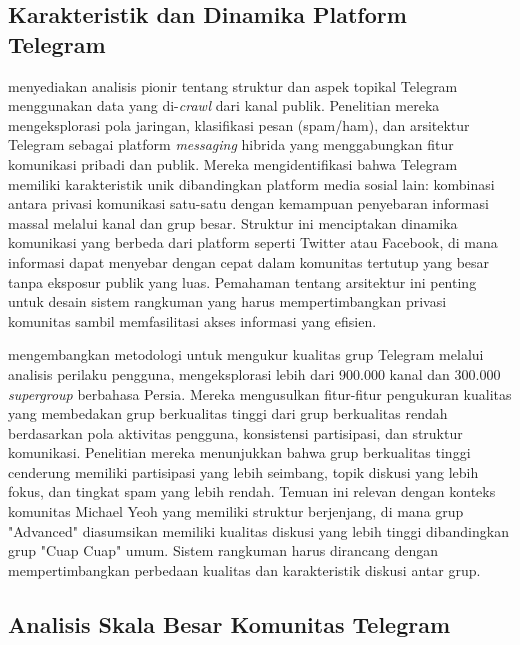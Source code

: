 \subsection{Karakteristik dan Dinamika Platform Telegram}

\textcite{nobari2017} menyediakan analisis pionir tentang struktur dan aspek topikal Telegram menggunakan data yang di-\textit{crawl} dari kanal publik. Penelitian mereka mengeksplorasi pola jaringan, klasifikasi pesan (spam/ham), dan arsitektur Telegram sebagai platform \textit{messaging} hibrida yang menggabungkan fitur komunikasi pribadi dan publik. Mereka mengidentifikasi bahwa Telegram memiliki karakteristik unik dibandingkan platform media sosial lain: kombinasi antara privasi komunikasi satu-satu dengan kemampuan penyebaran informasi massal melalui kanal dan grup besar. Struktur ini menciptakan dinamika komunikasi yang berbeda dari platform seperti Twitter atau Facebook, di mana informasi dapat menyebar dengan cepat dalam komunitas tertutup yang besar tanpa eksposur publik yang luas. Pemahaman tentang arsitektur ini penting untuk desain sistem rangkuman yang harus mempertimbangkan privasi komunitas sambil memfasilitasi akses informasi yang efisien.

\textcite{hashemi2019} mengembangkan metodologi untuk mengukur kualitas grup Telegram melalui analisis perilaku pengguna, mengeksplorasi lebih dari 900.000 kanal dan 300.000 \textit{supergroup} berbahasa Persia. Mereka mengusulkan fitur-fitur pengukuran kualitas yang membedakan grup berkualitas tinggi dari grup berkualitas rendah berdasarkan pola aktivitas pengguna, konsistensi partisipasi, dan struktur komunikasi. Penelitian mereka menunjukkan bahwa grup berkualitas tinggi cenderung memiliki partisipasi yang lebih seimbang, topik diskusi yang lebih fokus, dan tingkat spam yang lebih rendah. Temuan ini relevan dengan konteks komunitas Michael Yeoh yang memiliki struktur berjenjang, di mana grup "Advanced" diasumsikan memiliki kualitas diskusi yang lebih tinggi dibandingkan grup "Cuap Cuap" umum. Sistem rangkuman harus dirancang dengan mempertimbangkan perbedaan kualitas dan karakteristik diskusi antar grup.

\subsection{Analisis Skala Besar Komunitas Telegram}

